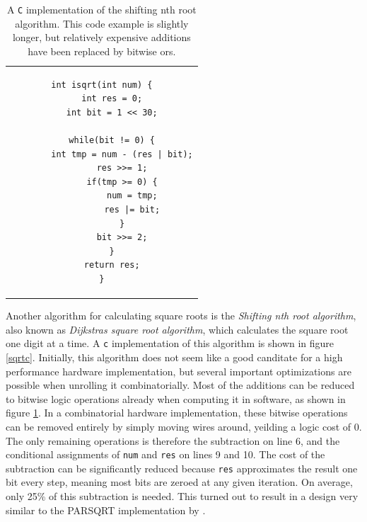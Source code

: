 			\begin{table}
				\centering
				\caption{A \texttt{C} implementation of the shifting nth root
					algorithm. This code example is slightly longer, but
					relatively expensive additions have been replaced by
					bitwise ors.}
				\label{sqrtcopt}
				\begin{tabular}{c}
				\begin{lstlisting}
int isqrt(int num) {
    int res = 0;
    int bit = 1 << 30;

    while(bit != 0) {
    	int tmp = num - (res | bit);
    	res >>= 1;
        if(tmp >= 0) {
            num = tmp;
            res |= bit;
        }
        bit >>= 2;
    }
    return res;
}
				\end{lstlisting}
				\end{tabular}
			\end{table}

			Another algorithm for calculating square roots is the
			\emph{Shifting nth root algorithm}, also known as \emph{Dijkstras
			square root algorithm}, which calculates the square root one digit
			at a time. A \texttt{c} implementation of this algorithm is shown
			in figure \ref{sqrtc}. Initially, this algorithm does not seem like
			a good canditate for a high performance hardware implementation,
			but several important optimizations are possible when unrolling it
			combinatorially. Most of the additions can be reduced to bitwise
			logic operations already when computing it in software, as shown in
			figure \ref{sqrtcopt}. In a combinatorial hardware implementation,
			these bitwise operations can be removed entirely by simply moving
			wires around, yeilding a logic cost of 0. The only remaining
			operations is therefore the subtraction on line 6, and the
			conditional assignments of \texttt{num} and \texttt{res} on lines 9
			and 10. The cost of the subtraction can be significantly reduced
			because \texttt{res} approximates the result one bit every step,
			meaning most bits are zeroed at any given iteration. On average,
			only 25\% of this subtraction is needed. This turned out to result
			in a design very similar to the PARSQRT implementation by
			\cite{japaneseSQRT}.
